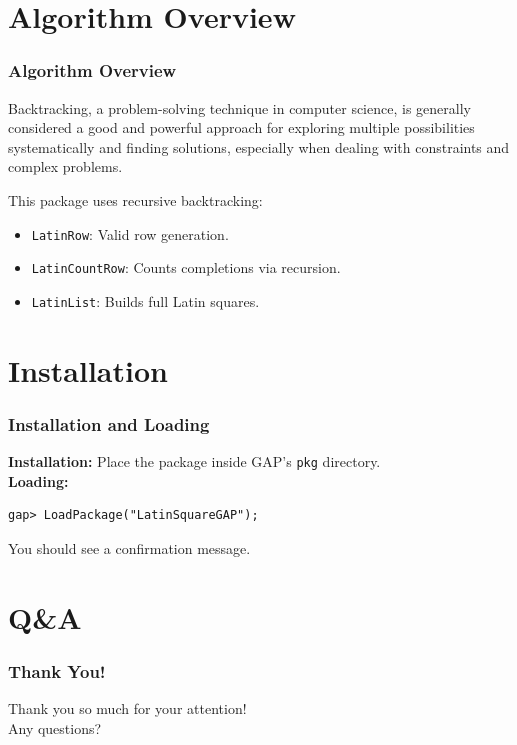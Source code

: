 \documentclass{beamer}
\begin{document}
\section{Algorithm Overview}
\begin{frame}
\frametitle{Algorithm Overview}

Backtracking, a problem-solving technique in computer science, is generally considered a good and powerful approach for exploring multiple possibilities systematically and finding solutions, especially when dealing with constraints and complex problems. 

This package uses recursive backtracking:
\begin{itemize}
  \item \texttt{LatinRow}: Valid row generation.
  \item \texttt{LatinCountRow}: Counts completions via recursion.
  \item \texttt{LatinList}: Builds full Latin squares.
\end{itemize}
\end{frame}

\section{Installation}
\begin{frame}[fragile]
\frametitle{Installation and Loading}
\textbf{Installation:}  
Place the package inside GAP's \texttt{pkg} directory.\\
\textbf{Loading:}
\begin{lstlisting}
gap> LoadPackage("LatinSquareGAP");
\end{lstlisting}
You should see a confirmation message.
\end{frame}


\section{Q\&A}
\begin{frame}
	\frametitle{Thank You!}
	\centering
	\Large Thank you so much for your attention!\\[1em]
	\Large Any questions?
\end{frame}
\end{document}
